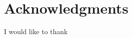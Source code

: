 \documentclass[aps,prb,twocolumn,superscriptaddress]{revtex4-1}
\begin{document}
\section*{Acknowledgments}
I would like to thank   %



\setlength{\parindent}{0cm}



\end{document}
